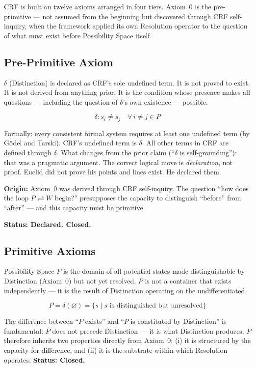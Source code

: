 \documentclass[12pt, a4paper]{article}
\begin{document}
CRF is built on twelve axioms arranged in four tiers. Axiom~0 is the pre-primitive ---
not assumed from the beginning but discovered through CRF self-inquiry, when the framework
applied its own Resolution operator to the question of what must exist before Possibility
Space itself.

\subsection{Pre-Primitive Axiom}

\begin{formalbox}[title={Axiom 0: Distinction ($\delta$) --- Indefinable Primitive}]
$\delta$ (Distinction) is declared as CRF's sole undefined term. It is not proved to
exist. It is not derived from anything prior. It is the condition whose presence makes
all questions --- including the question of $\delta$'s own existence --- possible.

\[
  \delta : s_i \neq s_j \quad \forall\, i \neq j \in P
\]

Formally: every consistent formal system requires at least one undefined term (by
G\"{o}del and Tarski). CRF's undefined term is $\delta$. All other terms in CRF are
defined through $\delta$. What changes from the prior claim (``$\delta$ is
self-grounding''): that was a pragmatic argument. The correct logical move is
\emph{declaration}, not proof. Euclid did not prove his points and lines exist.
He declared them.

\medskip
\textbf{Origin:} Axiom~0 was derived through CRF self-inquiry. The question
``how does the loop $P \rightleftharpoons W$ begin?'' presupposes the capacity to
distinguish ``before'' from ``after'' --- and this capacity must be primitive.

\textbf{Status: Declared. Closed.}
\end{formalbox}

\subsection{Primitive Axioms}

\begin{formalbox}[title={Axiom 1: Possibility Space ($P$)}]
Possibility Space $P$ is the domain of all potential states made distinguishable by
Distinction (Axiom~0) but not yet resolved. $P$ is not a container that exists
independently --- it is the result of Distinction operating on the undifferentiated.

\[
  P = \delta(\varnothing) = \{ s \mid s \text{ is distinguished but unresolved} \}
\]

The difference between ``$P$ exists'' and ``$P$ is constituted by Distinction'' is
fundamental: $P$ does not precede Distinction --- it is what Distinction produces.
$P$ therefore inherits two properties directly from Axiom~0: (i) it is structured by
the capacity for difference, and (ii) it is the substrate within which Resolution
operates. \textbf{Status: Closed.}
\end{formalbox}
\end{document}

